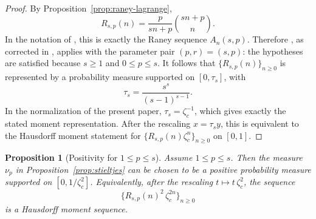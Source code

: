\documentclass[11pt]{amsart}
\numberwithin{equation}{section}
\theoremstyle{plain}
\newtheorem{proposition}[theorem]{Proposition}
\theoremstyle{definition}
\theoremstyle{remark}
\begin{document}
\begin{proof}
	By Proposition~\ref{prop:raney-lagrange},
	\[
		R_{s,p}(n)=\frac{p}{sn+p}\binom{sn+p}{n}.
	\]
	In the notation of \cite{LiuPego2016}, this is exactly the Raney sequence
	\(A_n(s,p)\). Therefore \cite[Thm.~5]{LiuPego2016}, as corrected in
	\cite{LiuPegoCorrigendum2026}, applies with the parameter pair
	\((p,r)=(s,p)\): the hypotheses are satisfied because \(s\ge1\) and
	\(0\le p\le s\). It follows that \(\{R_{s,p}(n)\}_{n\ge0}\) is represented
	by a probability measure supported on \([0,\tau_s]\), with
	\[
		\tau_s=\frac{s^s}{(s-1)^{s-1}}.
	\]
	In the normalization of the present paper,
	\(\tau_s=\zeta_c^{-1}\), which gives exactly the stated moment
	representation. After the rescaling \(x=\tau_s y\), this is equivalent to
	the Hausdorff moment statement for
	\(\{R_{s,p}(n)\zeta_c^n\}_{n\ge0}\) on \([0,1]\).
\end{proof}

\begin{proposition}[Positivity for \(1\le p\le s\)]
	\label{prop:mu-positive}
	Assume \(1\le p\le s\). Then the measure \(\nu_p\) in
	Proposition~\ref{prop:stieltjes} can be chosen to be a positive probability
	measure supported on \([0,1/\zeta_c^{2}]\). Equivalently, after the
	rescaling \(t\mapsto t\,\zeta_c^{2}\), the sequence
	\[
		\{R_{s,p}(n)^2\,\zeta_c^{2n}\}_{n\ge0}
	\]
	is a Hausdorff moment sequence.
\end{proposition}
\end{document}
